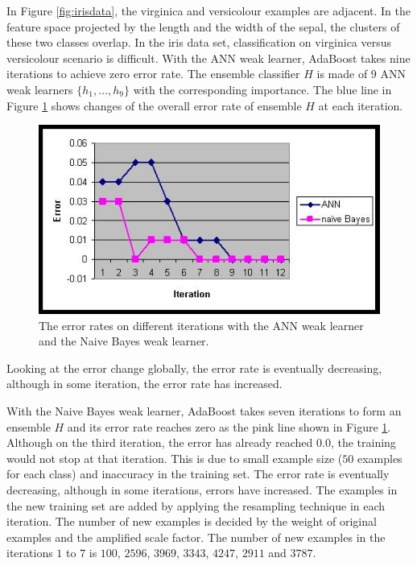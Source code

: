 In \mbox{Figure} \ref{fig:irisdata}, the virginica and versicolour examples are adjacent. In the feature space projected by the length and the width of the sepal, the clusters of these two classes overlap. In the iris data set, classification on virginica versus versicolour scenario is difficult. With the ANN weak learner, AdaBoost takes nine iterations to achieve zero error rate. The ensemble classifier $H$ is made of $9$ ANN weak learners $\{h_{1},\ldots,h_{9}\}$ with the corresponding importance. The blue line in \mbox{Figure} \ref{fig:annvsnaivebayes} shows changes of the overall error rate of ensemble $H$ at each iteration. 
\begin{figure}[ht]
 \begin{center}
  \includegraphics{ch4/figures/annvsnaivebayes.jpg}
  \caption{The error rates on different iterations with the ANN weak learner and the Naive Bayes weak learner.}
   \label{fig:annvsnaivebayes} 
\end{center}
\end{figure} 
Looking at the error change globally, the error rate is eventually decreasing, although in some iteration, the error rate has increased.

With the Naive Bayes weak learner, AdaBoost takes seven iterations to form an ensemble $H$ and its error rate reaches zero as the pink line shown in \mbox{Figure} \ref{fig:annvsnaivebayes}. Although on the third iteration, the error has already reached $0.0$, the training would not stop at that iteration. This is due to small example size ($50$ examples for each class) and inaccuracy in the training set. The error rate is eventually decreasing, although in some iterations, errors have increased. The examples in the new training set are added by applying the resampling technique in each iteration. The number of new examples is decided by the weight of original examples and the amplified scale factor. The number of new examples in the iterations $1$ to $7$ is $100$, $2596$, $3969$, $3343$, $4247$, $2911$ and $3787$.


